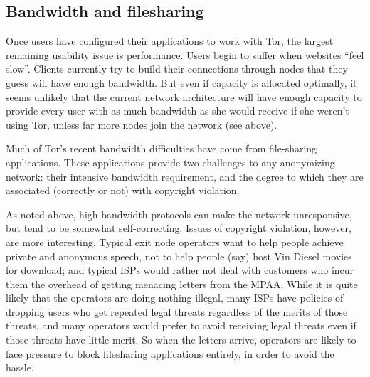 \documentclass{llncs}
\begin{document}


\subsection{Bandwidth and filesharing}
\label{subsec:bandwidth-and-filesharing}
Once users have configured their applications to work with Tor, the largest
remaining usability issue is performance.  Users begin to suffer
when websites ``feel slow''.
Clients currently try to build their connections through nodes that they
guess will have enough bandwidth.  But even if capacity is allocated
optimally, it seems unlikely that the current network architecture will have
enough capacity to provide every user with as much bandwidth as she would
receive if she weren't using Tor, unless far more nodes join the network
(see above).


Much of Tor's recent bandwidth difficulties have come from file-sharing
applications.  These applications provide two challenges to
any anonymizing network: their intensive bandwidth requirement, and the
degree to which they are associated (correctly or not) with copyright
violation.

As noted above, high-bandwidth protocols can make the network unresponsive,
but tend to be somewhat self-correcting.  Issues of copyright violation,
however, are more interesting.  Typical exit node operators want to help
people achieve private and anonymous speech, not to help people (say) host
Vin Diesel movies for download; and typical ISPs would rather not
deal with customers who incur them the overhead of getting menacing letters
from the MPAA\@.  While it is quite likely that the operators are doing nothing
illegal, many ISPs have policies of dropping users who get repeated legal
threats regardless of the merits of those threats, and many operators would
prefer to avoid receiving legal threats even if those threats have little
merit.  So when the letters arrive, operators are likely to face
pressure to block filesharing applications entirely, in order to avoid the
hassle.
\end{document}
